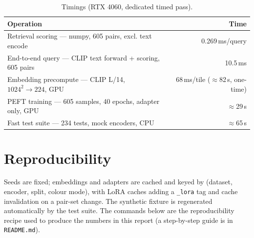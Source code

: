 \documentclass{article}
\begin{document}
\begin{table}[H]
    \centering
    \caption{Timings (RTX 4060, dedicated timed pass).}
    \label{tab:timings}
    \begin{tabular}{lr}
        \toprule
        \textbf{Operation} & \textbf{Time} \\
        \midrule
        Retrieval scoring --- numpy, 605 pairs, excl. text encode & 0.269\,ms/query \\
        End-to-end query --- CLIP text forward + scoring, 605 pairs & 10.5\,ms \\
        Embedding precompute --- CLIP L/14, $1024^2 \rightarrow 224$, GPU & 68\,ms/tile ($\approx$82\,s, one-time) \\
        PEFT training --- 605 samples, 40 epochs, adapter only, GPU & $\approx$29\,s \\
        Fast test suite --- 234 tests, mock encoders, CPU & $\approx$65\,s \\
        \bottomrule
    \end{tabular}
\end{table}


\section{Reproducibility}
\label{sec:repro}

Seeds are fixed; embeddings and adapters are cached and keyed by
(dataset, encoder, split, colour mode), with LoRA caches adding a \texttt{\_lora}
tag and cache invalidation on a pair-set change. The synthetic fixture is
regenerated automatically by the test suite. The commands below are the
reproducibility recipe used to produce the numbers in this report (a
step-by-step guide is in \texttt{README.md}).
\end{document}
